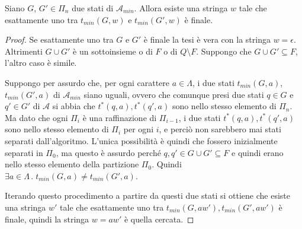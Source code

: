 \documentclass[12pt]{article}
\numberwithin{theorem}{subsection}
\begin{document}
\begin{lemma}
	Siano $G$, $G' \in \Pi_n$ due stati di $\mathcal{A}_{min}$. Allora esiste una stringa $w$ tale che esattamente uno tra $t_{min}(G, w)$ e $t_{min}(G', w)$ è finale.
\end{lemma}
\begin{proof}
%	
	
	Se esattamente uno tra $G$ e $G'$ è finale la tesi è vera con la stringa $w = \epsilon$. Altrimenti $G \cup G'$ è un sottoinsieme o di $F$ o di $Q \setminus F$. Suppongo che $G \cup G' \subseteq F$, l'altro caso è simile.
	
	Suppongo per assurdo che, per ogni carattere $a \in \Lambda$, i due stati $t_{min}(G, a)$, $t_{min}(G', a)$ di $\mathcal{A}_{min}$ siano uguali, ovvero che comunque presi due stati $q \in G$ e $q' \in G'$ di $\mathcal{A}$ si abbia che $t^*(q, a), t^*(q', a)$ sono nello stesso elemento di $\Pi_n$. Ma dato che ogni $\Pi_i$ è una raffinazione di $\Pi_{i-1}$, i due stati $t^*(q, a), t^*(q', a)$ sono nello stesso elemento di $\Pi_i$ per ogni $i$, e perciò non sarebbero mai stati separati dall'algoritmo. L'unica possibilità è quindi che fossero inizialmente separati in $\Pi_0$, ma questo è assurdo perché $q, q' \in G \cup G' \subseteq F$ e quindi erano nello stesso elemento della partizione $\Pi_0$.
	Quindi $\exists a \in \Lambda \,.\; t_{min}(G, a) \neq t_{min}(G', a)$.
	
	Iterando questo procedimento a partire da questi due stati si ottiene che esiste una stringa $w'$ tale che esattamente uno tra $t_{min}(G, aw'), t_{min}(G', aw')$ è finale, quindi la stringa $w = aw'$ è quella cercata.
\end{proof}
\end{document}
